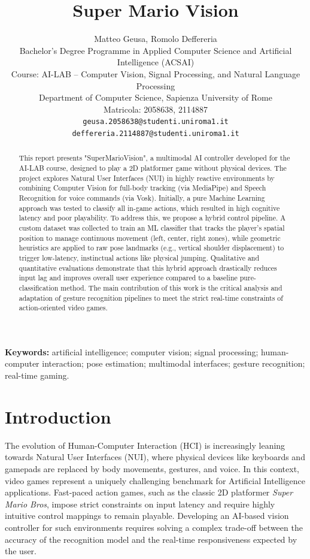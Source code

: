 \documentclass[10pt,twocolumn,a4paper]{article}
\title{\textbf{Super Mario Vision}}
\author{
	Matteo Geusa, Romolo Deffereria\\
	Bachelor's Degree Programme in Applied Computer Science and Artificial Intelligence (ACSAI)\\
	Course: AI-LAB -- Computer Vision, Signal Processing, and Natural Language Processing\\
	Department of Computer Science, Sapienza University of Rome\\
	Matricola: 2058638, 2114887\\
	\texttt{geusa.2058638@studenti.uniroma1.it}\\
	\texttt{deffereria.2114887@studenti.uniroma1.it}\\
}
\date{}
\begin{document}
	
	\maketitle
	
	\begin{abstract}
    This report presents "SuperMarioVision", a multimodal AI controller developed for the AI-LAB course, designed to play a 2D platformer game without physical devices. The project explores Natural User Interfaces (NUI) in highly reactive environments by combining Computer Vision for full-body tracking (via MediaPipe) and Speech Recognition for voice commands (via Vosk). Initially, a pure Machine Learning approach was tested to classify all in-game actions, which resulted in high cognitive latency and poor playability. To address this, we propose a hybrid control pipeline. A custom dataset was collected to train an ML classifier that tracks the player's spatial position to manage continuous movement (left, center, right zones), while geometric heuristics are applied to raw pose landmarks (e.g., vertical shoulder displacement) to trigger low-latency, instinctual actions like physical jumping. Qualitative and quantitative evaluations demonstrate that this hybrid approach drastically reduces input lag and improves overall user experience compared to a baseline pure-classification method. The main contribution of this work is the critical analysis and adaptation of gesture recognition pipelines to meet the strict real-time constraints of action-oriented video games.
    \end{abstract}

    \vspace{0.5cm}
    
    \textbf{Keywords:} artificial intelligence; computer vision; signal processing; human-computer interaction; pose estimation; multimodal interfaces; gesture recognition; real-time gaming.
	
	\section{Introduction}
	
	The evolution of Human-Computer Interaction (HCI) is increasingly leaning towards Natural User Interfaces (NUI), where physical devices like keyboards and gamepads are replaced by body movements, gestures, and voice. In this context, video games represent a uniquely challenging benchmark for Artificial Intelligence applications. Fast-paced action games, such as the classic 2D platformer \textit{Super Mario Bros}, impose strict constraints on input latency and require highly intuitive control mappings to remain playable. Developing an AI-based vision controller for such environments requires solving a complex trade-off between the accuracy of the recognition model and the real-time responsiveness expected by the user.
\end{document}

